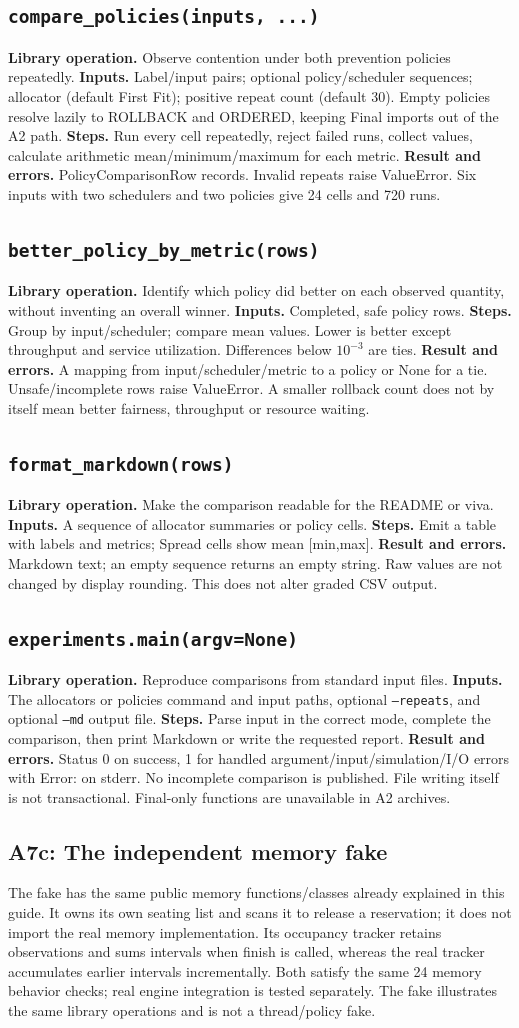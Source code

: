 \documentclass[11pt,a4paper]{article}
\newcommand{\routine}[2]{\subsection{\texorpdfstring{\texttt{#1}}{#2}}}
\newcommand{\librarymeaning}{\textbf{Library operation.} }
\newcommand{\arguments}{\textbf{Inputs.} }
\newcommand{\steps}{\textbf{Steps.} }
\newcommand{\result}{\textbf{Result and errors.} }
\begin{document}
\routine{compare\_policies(inputs, ...)}{Compare policies}
\librarymeaning Observe contention under both prevention policies repeatedly.
\arguments Label/input pairs; optional policy/scheduler sequences; allocator
(default First Fit); positive repeat count (default 30). Empty policies resolve
lazily to ROLLBACK and ORDERED, keeping Final imports out of the A2 path.
\steps Run every cell repeatedly, reject failed runs, collect values, calculate
arithmetic mean/minimum/maximum for each metric.
\result PolicyComparisonRow records. Invalid repeats raise ValueError. Six
inputs with two schedulers and two policies give 24 cells and 720 runs.

\routine{better\_policy\_by\_metric(rows)}{Rank metric means}
\librarymeaning Identify which policy did better on each observed quantity,
without inventing an overall winner.
\arguments Completed, safe policy rows.
\steps Group by input/scheduler; compare mean values. Lower is better except
throughput and service utilization. Differences below $10^{-3}$ are ties.
\result A mapping from input/scheduler/metric to a policy or None for a tie.
Unsafe/incomplete rows raise ValueError. A smaller rollback count does not
by itself mean better fairness, throughput or resource waiting.

\routine{format\_markdown(rows)}{Format comparison report}
\librarymeaning Make the comparison readable for the README or viva.
\arguments A sequence of allocator summaries or policy cells.
\steps Emit a table with labels and metrics; Spread cells show mean [min,max].
\result Markdown text; an empty sequence returns an empty string. Raw values
are not changed by display rounding. This does not alter graded CSV output.

\routine{experiments.main(argv=None)}{Experiment CLI}
\librarymeaning Reproduce comparisons from standard input files.
\arguments The allocators or policies command and input paths, optional
\texttt{--repeats}, and optional \texttt{--md} output file.
\steps Parse input in the correct mode, complete the comparison, then print
Markdown or write the requested report.
\result Status 0 on success, 1 for handled argument/input/simulation/I/O errors
with Error: on stderr. No incomplete comparison is published. File writing
itself is not transactional. Final-only functions are unavailable in A2 archives.

\subsection{A7c: The independent memory fake}
The fake has the same public memory functions/classes already explained in
this guide. It owns its own seating list and scans it to release a reservation;
it does not import the real memory implementation. Its occupancy tracker
retains observations and sums intervals when finish is called, whereas the
real tracker accumulates earlier intervals incrementally. Both satisfy the
same 24 memory behavior checks; real engine integration is tested separately.
The fake illustrates the same library operations and is not a thread/policy fake.
\end{document}
